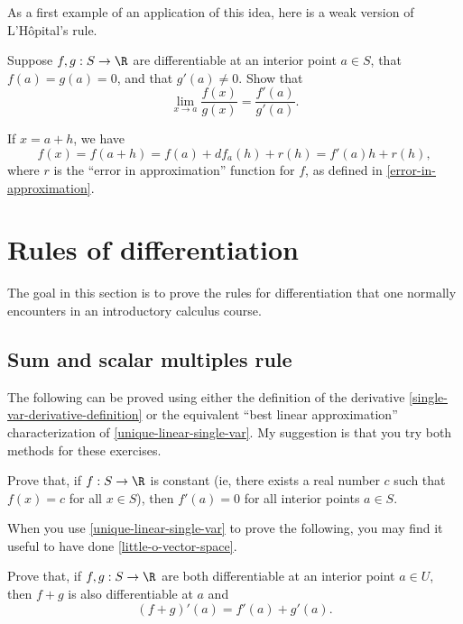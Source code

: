 As a first example of an application of this idea, here is a weak version of L'H\^opital's rule. 

\begin{exercise} \label{weak-lhopital}
	Suppose $f, g : S \to \R$ are differentiable at an interior point $a \in S$, that $f(a) = g(a) = 0$, and that $g'(a) \neq 0$. Show that
	\[ \lim_{x \to a} \frac{f(x)}{g(x)} = \frac{f'(a)}{g'(a)}. \]
	\begin{hint} If $x = a+h$, we have
	\[ f(x) = f(a+h) = f(a) + df_a(h) + r(h) = f'(a)h + r(h), \]
	where $r$ is the ``error in approximation'' function for $f$, as defined in \cref{error-in-approximation}. 
	\end{hint}
\end{exercise}

\section{Rules of differentiation}

The goal in this section is to prove the rules for differentiation that one normally encounters in an introductory calculus course. 

\subsection{Sum and scalar multiples rule}

The following can be proved using either the definition of the derivative \ref{single-var-derivative-definition} or the equivalent ``best linear approximation'' characterization of \cref{unique-linear-single-var}. My suggestion is that you try both methods for these exercises. 

\begin{exercise} \label{constant-deriv-zero}
	Prove that, if $f : S \to \R$ is constant (ie, there exists a real number $c$ such that $f(x) = c$ for all $x \in S$), then $f'(a) = 0$ for all interior points $a \in S$. 
\end{exercise}

When you use \cref{unique-linear-single-var} to prove the following, you may find it useful to have done \cref{little-o-vector-space}. 

\begin{exercise} \label{sum-rule-single}
	Prove that, if $f, g : S \to \R$ are both differentiable at an interior point $a \in U$, then $f + g$ is also differentiable at $a$ and \[ (f+g)'(a) = f'(a) + g'(a). \]
\end{exercise}

